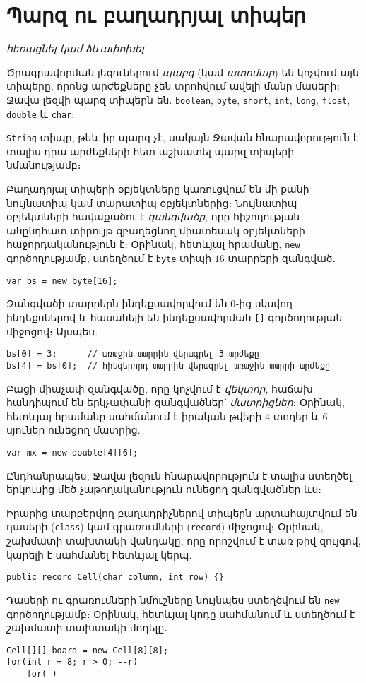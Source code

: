 \chapter{Պարզ ու բաղադրյալ տիպեր}

\textit{հեռացնել կամ ձևափոխել}

Ծրագրավորման լեզուներում \emph{պարզ} (կամ \emph{ատոմար}) են կոչվում
այն տիպերը, որոնց արժեքները չեն տրոհվում ավելի մանր մասերի։ Ջավա
լեզվի պարզ տիպերն են. \texttt{boolean}, \texttt{byte}, \texttt{short},
\texttt{int}, \texttt{long}, \texttt{float}, \texttt{double} և
\texttt{char}:

\texttt{String} տիպը, թեև իր պարզ չէ, սակայն Ջավան հնարավորություն է
տալիս դրա արժեքների հետ աշխատել պարզ տիպերի նմանությամբ։

Բաղադրյալ տիպերի օբյեկտները կառուցվում են մի քանի նույնատիպ կամ
տարատիպ օբյեկտներից։ Նույնատիպ օբյեկտների հավաքածու է \emph{զանգվածը},
որը հիշողության անընդհատ տիրույթ զբաղեցնող միատեսակ օբյեկտների
հաջորդականություն է։ Օրինակ, հետևյալ հրամանը, \texttt{new}
գործողությամբ, ստեղծում է \texttt{byte} տիպի \(16\) տարրերի զանգված․

\begin{verbatim}
var bs = new byte[16];
\end{verbatim}

\noindent Զանգվածի տարրերն ինդեքսավորվում են \(0\)֊ից սկսվող ինդեքսներով և
հասանելի են ինդեքսավորման \texttt{[]} գործողության միջոցով։ Այսպես.

\begin{verbatim}
bs[0] = 3;      // առաջին տարրին վերագրել 3 արժեքը
bs[4] = bs[0];  // հինգերորդ տարրին վերագրել առաջին տարրի արժեքը
\end{verbatim}

Բացի միաչափ զանգվածը, որը կոչվում է \emph{վեկտոր}, հաճախ հանդիպում են
երկչափանի զանգվածներ՝ \emph{մատրիցներ}։ Օրինակ, հետևյալ հրամանը սահմանում
է իրական թվերի 4 տողեր և 6 սյուներ ունեցող մատրից.

\begin{verbatim}
var mx = new double[4][6];
\end{verbatim}

Ընդհանրապես, Ջավա լեզուն հնարավորություն է տալիս ստեղծել երկուսից մեծ
չաթողականություն ունեցող զանգվածներ ևս։

Իրարից տարբերվող բաղադրիչներով տիպերն արտահայտվում են դասերի (\texttt{class})
կամ գրառումների (\texttt{record}) միջոցով։ Օրինակ, շախմատի տախտակի վանդակը,
որը որոշվում է տառ-թիվ զույգով, կարելի է սահմանել հետևյալ կերպ.

\begin{verbatim}
public record Cell(char column, int row) {}
\end{verbatim}

Դասերի ու գրառումների նմուշները նույնպես ստեղծվում են \texttt{new} գործողությամբ։
Օրինակ, հետևյալ կոդը սահմանում և ստեղծում է շախմատի տախտակի մոդելը․

\begin{verbatim}
Cell[][] board = new Cell[8][8];
for(int r = 8; r > 0; --r)
    for( )
\end{verbatim}

